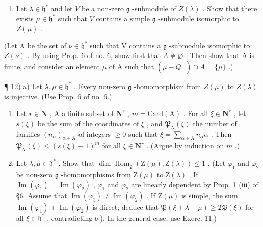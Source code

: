 \begin{enumerate}
\def\labelenumi{\arabic{enumi})}
\setcounter{enumi}{10}
\tightlist
\item
  Let \(\lambda \in \mathfrak{h}^*\) and let \(V\) be a non-zero \(\mathfrak{g}\) -submodule of \(Z(\lambda)\) . Show that there exists \(\mu \in \mathfrak{h}^*\) such that \(V\) contains a simple \(\mathfrak{g}\) -submodule isomorphic to \(Z(\mu)\) .
\end{enumerate}

(Let A be the set of \(\nu \in \mathfrak{h}^*\) such that V contains a \(\mathfrak{g}\) -submodule isomorphic to \(Z(\nu)\) . By using Prop. 6 of no. 6, show first that \(A \neq \varnothing\) . Then show that A is finite, and consider an element \(\mu\) of A such that \((\mu - Q_{+}) \cap A = \{\mu\}\) .)

¶ 12) a) Let \(\lambda, \mu \in \mathfrak{h}^*\) . Every non-zero \(\mathfrak{g}\) -homomorphism from \(Z(\mu)\) to \(Z(\lambda)\) is injective. (Use Prop. 6 of no. 6.)

\begin{enumerate}
\def\labelenumi{\alph{enumi})}
\setcounter{enumi}{1}
\item
  Let \(r \in \mathbf{N}\) , A a finite subset of \(\mathbf{N}^r\) , \(m = \mathrm{Card}(\mathrm{A})\) . For all \(\xi \in \mathbf{N}^r\) , let \(s(\xi)\) be the sum of the coordinates of \(\xi\) , and \(\mathfrak{P}_{\mathrm{A}}(\xi)\) the number of families \((n_{\alpha})_{\alpha \in \mathrm{A}}\) of integers \(\geq 0\) such that \(\xi = \sum_{\alpha \in \mathrm{A}} n_{\alpha}\alpha\) . Then \(\mathfrak{P}_{\mathrm{A}}(\xi) \leq (s(\xi) + 1)^m\) for all \(\xi \in \mathbf{N}^r\) . (Argue by induction on \(m\) .)
\item
  Let \(\lambda, \mu \in \mathfrak{h}^*\) . Show that \(\dim \operatorname{Hom}_{\mathfrak{g}}(\mathrm{Z}(\mu), \mathrm{Z}(\lambda)) \leq 1\) . (Let \(\varphi_1\) and \(\varphi_2\) be non-zero \(\mathfrak{g}\) -homomorphisms from \(\mathrm{Z}(\mu)\) to \(\mathrm{Z}(\lambda)\) . If \(\operatorname{Im}(\varphi_1) = \operatorname{Im}(\varphi_2)\) , \(\varphi_1\) and \(\varphi_2\) are linearly dependent by Prop. 1 (iii) of §6. Assume that \(\operatorname{Im}(\varphi_1) \neq \operatorname{Im}(\varphi_2)\) . If \(\mathrm{Z}(\mu)\) is simple, the sum \(\operatorname{Im}(\varphi_1) + \operatorname{Im}(\varphi_2)\) is direct; deduce that \(\mathfrak{P}(\xi + \lambda - \mu) \geq 2\mathfrak{P}(\xi)\) for all \(\xi \in \mathfrak{h}^*\) , contradicting \(b\) ). In the general case, use Exerc. 11.)
\end{enumerate}

